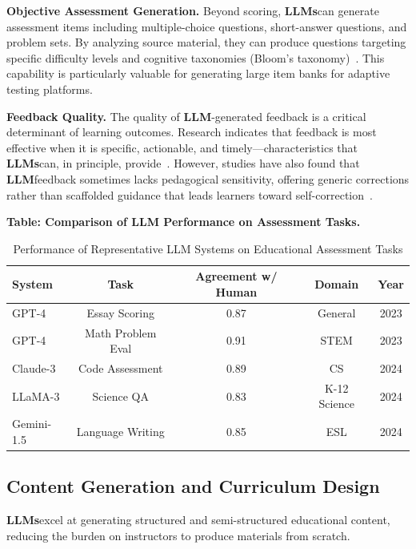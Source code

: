 \documentclass[preprint,12pt]{article}
\newcommand{\LLM}{\textbf{LLM}}
\newcommand{\LLMs}{\textbf{LLMs}}
\theoremstyle{mystyle}
\begin{document}
\textbf{Objective Assessment Generation.} Beyond scoring, \LLMs can generate assessment items including multiple-choice questions, short-answer questions, and problem sets. By analyzing source material, they can produce questions targeting specific difficulty levels and cognitive taxonomies (Bloom's taxonomy)~\citep{soll2024quizgen}. This capability is particularly valuable for generating large item banks for adaptive testing platforms.

\textbf{Feedback Quality.} The quality of \LLM-generated feedback is a critical determinant of learning outcomes. Research indicates that feedback is most effective when it is specific, actionable, and timely---characteristics that \LLMs can, in principle, provide~\citep{narciss2008feedback}. However, studies have also found that \LLM feedback sometimes lacks pedagogical sensitivity, offering generic corrections rather than scaffolded guidance that leads learners toward self-correction~\citep{kasneci2023chatgpt}.

\textbf{Table: Comparison of LLM Performance on Assessment Tasks.}
\begin{table}[htbp]
    \centering
    \caption{Performance of Representative LLM Systems on Educational Assessment Tasks}
    \label{tab:assessment_comparison}
    \begin{tabular}{@{}lcccc@{}}
        \toprule
        \textbf{System} & \textbf{Task} & \textbf{Agreement w/ Human} & \textbf{Domain} & \textbf{Year} \\
        \midrule
        GPT-4 & Essay Scoring & 0.87 & General & 2023 \\
        GPT-4 & Math Problem Eval & 0.91 & STEM & 2023 \\
        Claude-3 & Code Assessment & 0.89 & CS & 2024 \\
        LLaMA-3 & Science QA & 0.83 & K-12 Science & 2024 \\
        Gemini-1.5 & Language Writing & 0.85 & ESL & 2024 \\
        \bottomrule
    \end{tabular}
\end{table}

\subsection{Content Generation and Curriculum Design}
\label{sec:content}

\LLMs excel at generating structured and semi-structured educational content, reducing the burden on instructors to produce materials from scratch.
\end{document}
